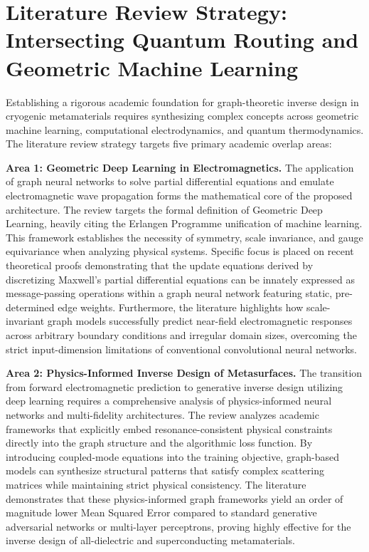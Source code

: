 \documentclass[11pt, a4paper]{article}
\begin{document}
\section{Literature Review Strategy: Intersecting Quantum Routing and Geometric Machine Learning}

Establishing a rigorous academic foundation for graph-theoretic inverse design in cryogenic metamaterials requires synthesizing complex concepts across geometric machine learning, computational electrodynamics, and quantum thermodynamics. The literature review strategy targets five primary academic overlap areas:

\textbf{Area 1: Geometric Deep Learning in Electromagnetics.} The application of graph neural networks to solve partial differential equations and emulate electromagnetic wave propagation forms the mathematical core of the proposed architecture. The review targets the formal definition of Geometric Deep Learning, heavily citing the Erlangen Programme unification of machine learning. This framework establishes the necessity of symmetry, scale invariance, and gauge equivariance when analyzing physical systems. Specific focus is placed on recent theoretical proofs demonstrating that the update equations derived by discretizing Maxwell's partial differential equations can be innately expressed as message-passing operations within a graph neural network featuring static, pre-determined edge weights. Furthermore, the literature highlights how scale-invariant graph models successfully predict near-field electromagnetic responses across arbitrary boundary conditions and irregular domain sizes, overcoming the strict input-dimension limitations of conventional convolutional neural networks.

\textbf{Area 2: Physics-Informed Inverse Design of Metasurfaces.} The transition from forward electromagnetic prediction to generative inverse design utilizing deep learning requires a comprehensive analysis of physics-informed neural networks and multi-fidelity architectures. The review analyzes academic frameworks that explicitly embed resonance-consistent physical constraints directly into the graph structure and the algorithmic loss function. By introducing coupled-mode equations into the training objective, graph-based models can synthesize structural patterns that satisfy complex scattering matrices while maintaining strict physical consistency. The literature demonstrates that these physics-informed graph frameworks yield an order of magnitude lower Mean Squared Error compared to standard generative adversarial networks or multi-layer perceptrons, proving highly effective for the inverse design of all-dielectric and superconducting metamaterials.
\end{document}
